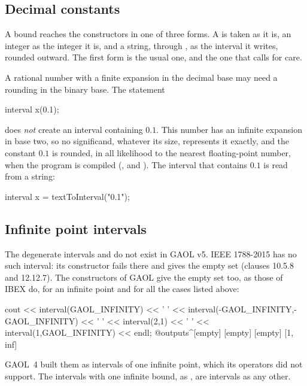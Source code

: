\documentclass[12pt,a4paper,twoside,openright]{book}
\begin{document}
\subsection{Decimal constants}

A bound reaches the constructors in one of three forms. A  is
taken as it is, an integer as the integer it is, and a string, through
, as the interval it writes, rounded outward. The
first form is the usual one, and the one that calls for care.

\begin{Rem}
A rational number with a finite expansion in the decimal base may need a
rounding in the binary base. The statement
\begin{example}
  interval x(0.1);
\end{example}
\noindent
does \emph{not} create an interval containing $0.1$. This number has an
infinite expansion in base two, so no significand, whatever its size,
represents it exactly, and the constant $0.1$ is rounded, in all likelihood
to the nearest floating-point number, when the program is compiled
(, and ). The
interval that contains $0.1$ is read from a string:
\begin{example}
interval x = textToInterval("0.1");
\end{example}
\end{Rem}

\subsection{Infinite point intervals}\label{par:inf_inf_note}
%

The degenerate intervals \itv{+\infty}{+\infty} and \itv{-\infty}{-\infty} do
not exist in GAOL v5.\newinvfive{} IEEE 1788-2015 \cite{IEEE1788:2015} has no
such interval: its constructor fails there and gives the empty set (clauses
10.5.8 and 12.12.7). The constructors of GAOL give the empty set too, as
those of IBEX do, for an infinite point and for all the cases listed above:
\begin{example}
cout << interval(GAOL_INFINITY) << ' '
     << interval(-GAOL_INFINITY,-GAOL_INFINITY) << ' '
     << interval(2,1) << ' '
     << interval(1,GAOL_INFINITY) << endl;
@outputs^[empty] [empty] [empty] [1, inf]~
\end{example}
GAOL~4 built them as intervals of one infinite point, which its operators did
not support. The intervals with one infinite bound, as , are
intervals as any other.
\end{document}
